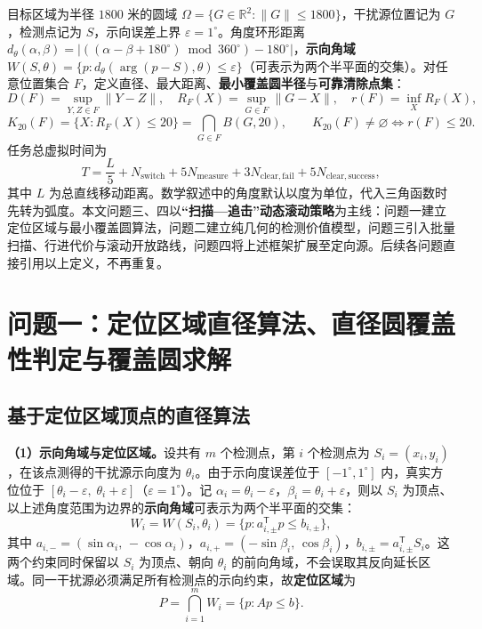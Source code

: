 \documentclass[withoutpreface]{cumcmthesis}
\begin{document}
目标区域为半径 $1800$ 米的圆域 $\Omega=\{G\in\mathbb R^2:\|G\|\le1800\}$，干扰源位置记为 $G$，检测点记为 $S$，示向误差上界 $\varepsilon=1^\circ$。角度环形距离 $d_\theta(\alpha,\beta)=\left|((\alpha-\beta+180^\circ)\bmod 360^\circ)-180^\circ\right|$，\textbf{示向角域} $W(S,\theta)=\{p:d_\theta(\arg(p-S),\theta)\le\varepsilon\}$（可表示为两个半平面的交集）。对任意位置集合 $F$，定义直径、最大距离、\textbf{最小覆盖圆半径}与\textbf{可靠清除点集}：
\[
D(F)=\sup_{Y,Z\in F}\|Y-Z\|,\quad
R_F(X)=\sup_{G\in F}\|G-X\|,\quad
r(F)=\inf_X R_F(X),
\]
\[
K_{20}(F)=\{X:R_F(X)\le20\}=\bigcap_{G\in F}B(G,20),
\qquad
K_{20}(F)\ne\varnothing \iff r(F)\le20.
\]
任务总虚拟时间为
\[
T=\frac{L}{5}+N_{\mathrm{switch}}+5N_{\mathrm{measure}}
+3N_{\mathrm{clear,fail}}+5N_{\mathrm{clear,success}},
\]
其中 $L$ 为总直线移动距离。数学叙述中的角度默认以度为单位，代入三角函数时先转为弧度。本文问题三、四以\textbf{“扫描—追击”动态滚动策略}为主线：问题一建立定位区域与最小覆盖圆算法，问题二建立纯几何的检测价值模型，问题三引入批量扫描、行进代价与滚动开放路线，问题四将上述框架扩展至定向源。后续各问题直接引用以上定义，不再重复。

\section{问题一：定位区域直径算法、直径圆覆盖性判定与覆盖圆求解}\label{sec:q1}

\subsection{基于定位区域顶点的直径算法}

\textbf{（1）示向角域与定位区域。}设共有 $m$ 个检测点，第 $i$ 个检测点为 $S_i=(x_i,y_i)$，在该点测得的干扰源示向度为 $\theta_i$。由于示向度误差位于 $[-1^\circ,1^\circ]$ 内，真实方位位于 $[\theta_i-\varepsilon,\;\theta_i+\varepsilon]$（$\varepsilon=1^\circ$）。记 $\alpha_i=\theta_i-\varepsilon$，$\beta_i=\theta_i+\varepsilon$，则以 $S_i$ 为顶点、以上述角度范围为边界的\textbf{示向角域}可表示为两个半平面的交集：
\begin{equation}\label{eq:halfplane}
W_i=W(S_i,\theta_i)
=\{p:a_{i,\pm}^{\mathsf T}p\leq b_{i,\pm}\},
\end{equation}
其中 $a_{i,-}=(\sin\alpha_i,\,-\cos\alpha_i)$，$a_{i,+}=(-\sin\beta_i,\,\cos\beta_i)$，$b_{i,\pm}=a_{i,\pm}^{\mathsf T}S_i$。这两个约束同时保留以 $S_i$ 为顶点、朝向 $\theta_i$ 的前向角域，不会误取其反向延长区域。同一干扰源必须满足所有检测点的示向约束，故\textbf{定位区域}为
\begin{equation}\label{eq:loc_region}
P=\bigcap_{i=1}^{m}W_i=\{p:Ap\leq b\}.
\end{equation}
\end{document}
